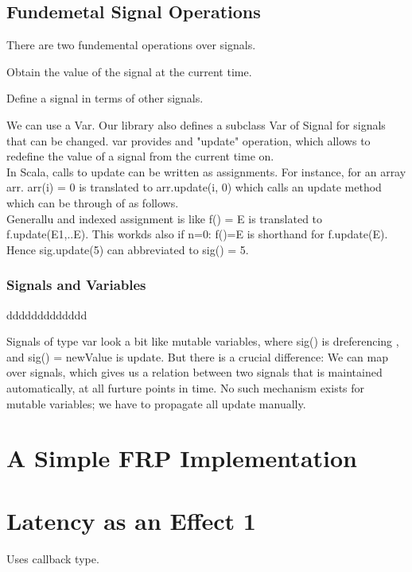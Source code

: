\documentclass[10pt, a4paper]{report}
\begin{document}
\subsection{Fundemetal Signal Operations}

There are two fundemental operations over signals.
\begin{list}{•}{•}
\item Obtain the value of the signal at the current time. 
\item Define a signal in terms of other signals.

\end{list}

We can use a Var. Our library also defines a subclass Var of Signal for signals that can be changed. var provides and "update" operation, which allows to redefine the value of a signal from the current time on.\\

In Scala, calls to update can be written as assignments. For instance, for an array arr. arr(i) = 0 is translated to arr.update(i, 0) which calls an update method which can be through of as follows. \\

Generallu and indexed assignment is like f() = E is translated to f.update(E1,..E). This workds also if n=0: f()=E is shorthand for f.update(E). Hence sig.update(5) can abbreviated to sig() = 5.

\subsubsection{Signals and Variables}ddddddddddddd

Signals of type var look a bit like mutable variables, where sig() is dreferencing , and sig() = newValue is update. But there is a crucial difference: We can map over signals, which gives us a relation between two signals that is maintained automatically, at all furture points in time. No such mechanism exists for mutable variables; we have to propagate all update manually.

\section{A Simple FRP Implementation}
\section{Latency as an Effect 1}
Uses callback type.
\end{document}
